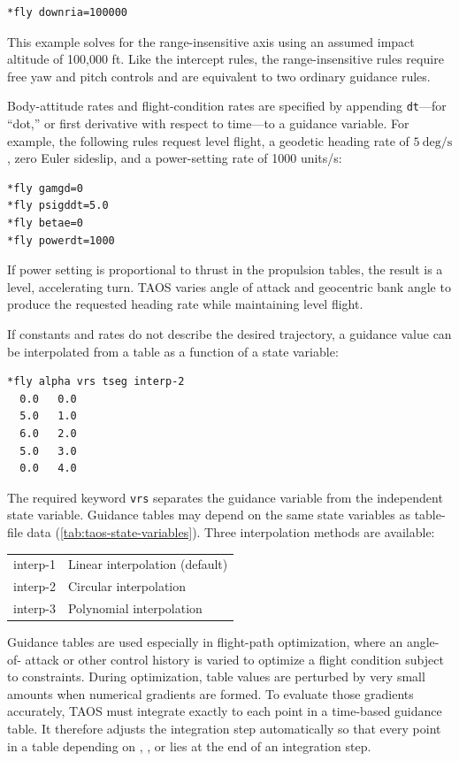 \begin{lstlisting}[style=taosmanual]
*fly downria=100000
\end{lstlisting}

This example solves for the range-insensitive axis using an assumed impact altitude
of 100,000 ft. Like the intercept rules, the range-insensitive rules require free yaw
and pitch controls and are equivalent to two ordinary guidance rules.


Body-attitude rates and flight-condition rates are specified by appending
\texttt{dt}---for ``dot,'' or first derivative with respect to time---to a guidance
variable. For example, the following rules request level flight, a geodetic heading
rate of $5~\mathrm{deg/s}$, zero Euler sideslip, and a power-setting rate of 1000
units/s:

\begin{lstlisting}[style=taosmanual]
*fly gamgd=0
*fly psigddt=5.0
*fly betae=0
*fly powerdt=1000
\end{lstlisting}

If power setting is proportional to thrust in the propulsion tables, the result is a
level, accelerating turn. TAOS varies angle of attack and geocentric bank angle to
produce the requested heading rate while maintaining level flight.


If constants and rates do not describe the desired trajectory, a guidance value can be
interpolated from a table as a function of a state variable:

\begin{lstlisting}[style=taosmanual]
*fly alpha vrs tseg interp-2
  0.0   0.0
  5.0   1.0
  6.0   2.0
  5.0   3.0
  0.0   4.0
\end{lstlisting}

The required keyword \texttt{vrs} separates the guidance variable from the
independent state variable. Guidance tables may depend on the same state variables
as table-file data (\cref{tab:taos-state-variables}). Three interpolation methods
are available:

\begin{center}
\begin{tabular}{@{}>{\ttfamily}ll@{}}
  interp-1 & Linear interpolation (default) \\
  interp-2 & Circular interpolation \\
  interp-3 & Polynomial interpolation \\
\end{tabular}
\end{center}

Guidance tables are used especially in flight-path optimization, where an angle-of-
attack or other control history is varied to optimize a flight condition subject to
constraints. During optimization, table values are perturbed by very small amounts
when numerical gradients are formed. To evaluate those gradients accurately, TAOS
must integrate exactly to each point in a time-based guidance table. It therefore
adjusts the integration step automatically so that every point in a table depending on
, , or  lies at the end of an integration
step.

